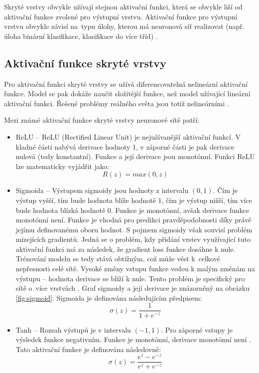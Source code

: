 Skryté vrstvy obvykle užívají stejnou aktivační funkci, která se obvykle liší od aktivační funkce zvolené pro výstupní vrstvu. Aktivační funkce pro výstupní vrstvu obvykle závisí na~typu úlohy, kterou má neuronová síť realizovat (např. úloha binární klasifikace, klasifikace do více tříd) \cite{HowToChooseActivationFunction}.

\subsection*{Aktivační funkce skryté vrstvy}
Pro aktivační funkci skryté vrstvy se užívá diferencovatelná nelineární aktivační funkce. Model se pak dokáže naučit složitější funkce, než model užívající lineární aktivační funkci. Řešené problémy reálného světa jsou totiž nelineárními \cite{HowToChooseActivationFunction}. 

Mezi známé aktivační funkce skryté vrstvy neuronové sítě patří:
\begin{itemize}
    \item ReLU -- ReLU (Rectified Linear Unit) je nejužívanější aktivační funkcí. V kladné části nabývá derivace hodnoty 1, v záporné části je pak derivace nulová (tedy konstantní). Funkce a její derivace jsou monotónní. Funkci ReLU lze matematicky vyjádřit jako:
    \begin{equation} 
    R(z) = max(0, z)
    \end{equation} 
    \item Sigmoida -- Výstupem sigmoidy jsou hodnoty z intervalu $(0, 1)$. Čím je výstup vyšší, tím bude hodnota blíže hodnotě 1, čím je výstup nižší, tím více bude hodnota blízká hodnotě 0. Funkce je monotónní, avšak derivace funkce monotónní není. Funkce je vhodná pro predikci pravděpodobnosti díky právě jejímu definovanému oboru hodnot. S pojmem sigmoidy však souvisí problém mizejících gradientů. Jedná se o problém, kdy přidání vrstev využívající tuto aktivační funkci má za následek, že gradient loss funkce dosáhne k nule. Trénování modelu se tedy stává obtížným, což může vést k~celkové nepřesnosti celé sítě. Vysoké změny vstupu funkce vedou k malým změnám na výstupu -- hodnota derivace se blíží k nule. Tento problém je specifický pro sítě o~více vrstvách \cite{VanishingGradientProblem}. Graf sigmoidy a její derivace je znázorněný na obrázku \ref{fig:sigmoid}. Sigmoida je definována následujícím předpisem:
     \begin{equation} 
    \sigma(z) = \frac{1}{1+e^{-z}}
    \end{equation} 
    \item Tanh -- Rozsah výstupů je v intervalu $(-1, 1)$. Pro záporné vstupy je výsledek funkce negativním. Funkce je monotónní, derivace monotónní není \cite{ActivationFunctionsInNeuralNetworks}. Tato aktivační funkce je definována následovně:
       \begin{equation} 
    \sigma(z) = \frac{e^{z}-e^{-z}}{e^{z}+e^{-z}}
    \end{equation} 
\end{itemize}

